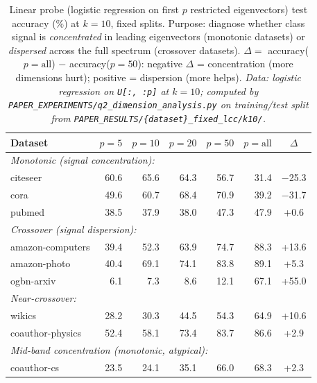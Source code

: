 \documentclass[11pt]{article}
\begin{document}
\begin{table}[H]
\centering
\caption{Linear probe (logistic regression on first $p$ restricted eigenvectors) test
accuracy (\%) at $k{=}10$, fixed splits.
Purpose: diagnose whether class signal is \emph{concentrated} in leading eigenvectors
(monotonic datasets) or \emph{dispersed} across the full spectrum (crossover datasets).
$\Delta =$ accuracy($p{=}\mathrm{all}$) $-$ accuracy($p{=}50$):
negative $\Delta$ = concentration (more dimensions hurt); positive = dispersion (more helps).
\textit{\scriptsize Data: logistic regression on \texttt{U[:, :p]} at $k{=}10$;
computed by \texttt{PAPER\_EXPERIMENTS/q2\_dimension\_analysis.py} on training/test
split from \texttt{PAPER\_RESULTS/\{dataset\}\_fixed\_lcc/k10/}.}}
\label{tab:linear_probe}
\begin{tabular}{lrrrrrc}
\toprule
Dataset & $p{=}5$ & $p{=}10$ & $p{=}20$ & $p{=}50$ & $p{=}\text{all}$ & $\Delta$ \\
\midrule
\multicolumn{7}{l}{\textit{Monotonic (signal concentration):}} \\
citeseer         & 60.6 & 65.6 & 64.3 & 56.7 & 31.4 & \textcolor{negnred}{$-$25.3} \\
cora             & 49.6 & 60.7 & 68.4 & 70.9 & 39.2 & \textcolor{negnred}{$-$31.7} \\
pubmed           & 38.5 & 37.9 & 38.0 & 47.3 & 47.9 & \textcolor{posgreen}{+0.6}   \\
\midrule
\multicolumn{7}{l}{\textit{Crossover (signal dispersion):}} \\
amazon-computers & 39.4 & 52.3 & 63.9 & 74.7 & 88.3 & \textcolor{posgreen}{+13.6} \\
amazon-photo     & 40.4 & 69.1 & 74.1 & 83.8 & 89.1 & \textcolor{posgreen}{+5.3}  \\
ogbn-arxiv       & 6.1  & 7.3  & 8.6  & 12.1 & 67.1 & \textcolor{posgreen}{+55.0} \\
\midrule
\multicolumn{7}{l}{\textit{Near-crossover:}} \\
wikics           & 28.2 & 30.3 & 44.5 & 54.3 & 64.9 & \textcolor{posgreen}{+10.6} \\
coauthor-physics & 52.4 & 58.1 & 73.4 & 83.7 & 86.6 & \textcolor{posgreen}{+2.9}  \\
\midrule
\multicolumn{7}{l}{\textit{Mid-band concentration (monotonic, atypical):}} \\
coauthor-cs      & 23.5 & 24.1 & 35.1 & 66.0 & 68.3 & \textcolor{posgreen}{+2.3}  \\
\bottomrule
\end{tabular}
\end{table}
\end{document}
